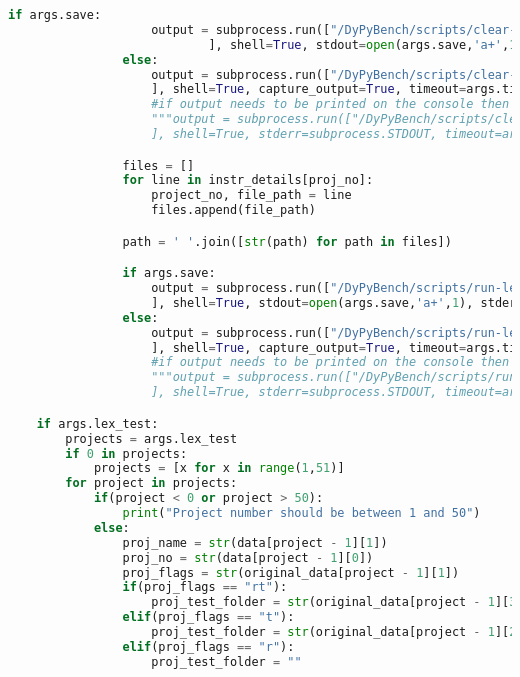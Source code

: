 \begin{lstlisting}[caption=Access Interface of DyPyBench,label=code:dypybench.py,language=Python]
                if args.save:
                    output = subprocess.run(["/DyPyBench/scripts/clear-project.sh %s %s" %(proj_name, proj_no)
                            ], shell=True, stdout=open(args.save,'a+',1), stderr=subprocess.STDOUT, timeout=args.timeout)
                else:
                    output = subprocess.run(["/DyPyBench/scripts/clear-project.sh %s %s" %(proj_name, proj_no)
                    ], shell=True, capture_output=True, timeout=args.timeout)
                    #if output needs to be printed on the console then comment above and uncomment below
                    """output = subprocess.run(["/DyPyBench/scripts/clear-project.sh %s %s" %(proj_name, proj_no)
                    ], shell=True, stderr=subprocess.STDOUT, timeout=args.timeout)"""

                files = []
                for line in instr_details[proj_no]:
                    project_no, file_path = line
                    files.append(file_path)

                path = ' '.join([str(path) for path in files])

                if args.save:
                    output = subprocess.run(["/DyPyBench/scripts/run-lex-instrumentation.sh %s %s %s %s" %(proj_name, proj_no, args.timeout, path)
                    ], shell=True, stdout=open(args.save,'a+',1), stderr=subprocess.STDOUT, timeout=args.timeout)
                else:
                    output = subprocess.run(["/DyPyBench/scripts/run-lex-instrumentation.sh %s %s %s %s" %(proj_name, proj_no, args.timeout, path)
                    ], shell=True, capture_output=True, timeout=args.timeout)
                    #if output needs to be printed on the console then comment above and uncomment below
                    """output = subprocess.run(["/DyPyBench/scripts/run-lex-instrumentation.sh %s %s %s %s" %(proj_name, proj_no, args.timeout, path)
                    ], shell=True, stderr=subprocess.STDOUT, timeout=args.timeout)"""

    if args.lex_test:
        projects = args.lex_test
        if 0 in projects:
            projects = [x for x in range(1,51)]
        for project in projects:
            if(project < 0 or project > 50):
                print("Project number should be between 1 and 50")
            else:
                proj_name = str(data[project - 1][1])
                proj_no = str(data[project - 1][0])
                proj_flags = str(original_data[project - 1][1])
                if(proj_flags == "rt"):
                    proj_test_folder = str(original_data[project - 1][3])
                elif(proj_flags == "t"):
                    proj_test_folder = str(original_data[project - 1][2])
                elif(proj_flags == "r"):
                    proj_test_folder = ""


\end{lstlisting}
